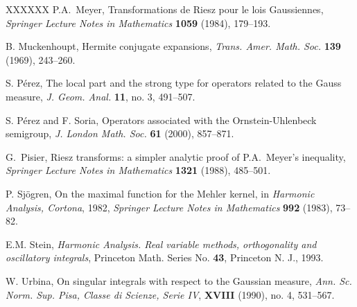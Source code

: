 \documentclass{amsart}                 %
\numberwithin{equation}{section}
\newcommand\1{{\bf 1}}
\begin{document}
\begin{thebibliography}{XXXXXX}
 P.A.~Meyer, 
{Transformations de Riesz pour le lois
Gaussiennes},
\emph{Springer Lecture Notes in Mathematics} \textbf{1059} (1984), 
179--193.

  B. Muckenhoupt,
{Hermite conjugate expansions}, 
\emph{Trans. Amer. Math. Soc.}
\textbf{139} (1969), 243--260.


  S. P\'erez,  {The local part and the strong type for 
operators related to the Gauss measure}, 
\emph{J. Geom. Anal.} \textbf{11}, no. 3, 491--507.

 S. P\'erez and F. Soria, {Operators associated with 
the Ornstein-Uhlenbeck semigroup}, 
\emph{J. London Math. Soc.} \textbf{61} (2000), 857--871.

 G.~Pisier,  {Riesz transforms: a simpler analytic 
proof of
P.A.~Meyer's inequality},
\emph{Springer Lecture Notes in Mathematics} {\bf 1321}
(1988),  485--501.

P. Sj\"ogren,  {On the maximal function for the Mehler kernel},
in \emph{Harmonic Analysis, Cortona}, 1982, 
\emph{Springer Lecture Notes
in Mathematics} \textbf{992} (1983), 73--82.

 E.M. Stein, \emph{Harmonic Analysis. Real variable
methods, orthogonality and oscillatory integrals}, Princeton Math. 
Series
No. \textbf{43}, Princeton N. J., 1993.

 W. Urbina,
{On singular integrals with respect to the Gaussian measure},
\emph{Ann. Sc. Norm. Sup. Pisa, Classe di Scienze, Serie IV},
\textbf{XVIII} (1990), no. 4, 531--567.
\end{thebibliography}
\end{document}
